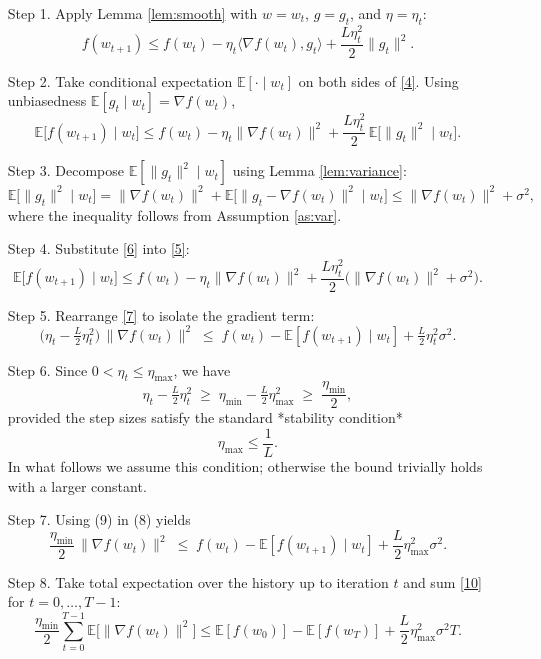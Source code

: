 \documentclass[11pt]{article}
\begin{document}
\begin{enumerate}
\item[Step 1.] Apply Lemma \ref{lem:smooth} with $w=w_t$, $g=g_t$, and $\eta=\eta_t$:
\[
f(w_{t+1})\le f(w_t)-\eta_t\langle\nabla f(w_t),g_t\rangle+\frac{L\eta_t^{2}}{2}\|g_t\|^{2}.
\tag{4}
\]

\item[Step 2.] Take conditional expectation $\mathbb{E}[\cdot\mid w_t]$ on both sides of \eqref{4}. Using unbiasedness $\mathbb{E}[g_t\mid w_t]=\nabla f(w_t)$,
\[
\mathbb{E}\big[f(w_{t+1})\mid w_t\big]\le
f(w_t)-\eta_t\|\nabla f(w_t)\|^{2}
+\frac{L\eta_t^{2}}{2}\,\mathbb{E}\big[\|g_t\|^{2}\mid w_t\big].
\tag{5}
\]

\item[Step 3.] Decompose $\mathbb{E}[\|g_t\|^{2}\mid w_t]$ using Lemma \ref{lem:variance}:
\[
\mathbb{E}\big[\|g_t\|^{2}\mid w_t\big]
= \|\nabla f(w_t)\|^{2}+\mathbb{E}\big[\|g_t-\nabla f(w_t)\|^{2}\mid w_t\big]
\le \|\nabla f(w_t)\|^{2}+\sigma^{2},
\tag{6}
\]
where the inequality follows from Assumption \ref{as:var}.

\item[Step 4.] Substitute \eqref{6} into \eqref{5}:
\[
\mathbb{E}\big[f(w_{t+1})\mid w_t\big]\le
f(w_t)-\eta_t\|\nabla f(w_t)\|^{2}
+\frac{L\eta_t^{2}}{2}\big(\|\nabla f(w_t)\|^{2}+\sigma^{2}\big).
\tag{7}
\]

\item[Step 5.] Rearrange \eqref{7} to isolate the gradient term:
\[
\big(\eta_t-\tfrac{L}{2}\eta_t^{2}\big)\,\|\nabla f(w_t)\|^{2}
\;\le\;
f(w_t)-\mathbb{E}[f(w_{t+1})\mid w_t]
+\tfrac{L}{2}\eta_t^{2}\sigma^{2}.
\tag{8}
\]

\item[Step 6.] Since $0<\eta_t\le\eta_{\max}$, we have
\[
\eta_t-\tfrac{L}{2}\eta_t^{2}
\;\ge\;
\eta_{\min}-\tfrac{L}{2}\eta_{\max}^{2}
\;\ge\;
\frac{\eta_{\min}}{2},
\tag{9}
\]
provided the step sizes satisfy the standard *stability condition*
\[
\eta_{\max}\le \frac{1}{L}.
\]
In what follows we assume this condition; otherwise the bound trivially holds with a larger constant.

\item[Step 7.] Using (9) in (8) yields
\[
\frac{\eta_{\min}}{2}\,\|\nabla f(w_t)\|^{2}
\;\le\;
f(w_t)-\mathbb{E}[f(w_{t+1})\mid w_t]
+\frac{L}{2}\eta_{\max}^{2}\sigma^{2}.
\tag{10}
\]

\item[Step 8.] Take total expectation over the history up to iteration $t$ and sum \eqref{10} for $t=0,\dots,T-1$:
\[
\frac{\eta_{\min}}{2}\sum_{t=0}^{T-1}\mathbb{E}\big[\|\nabla f(w_t)\|^{2}\big]
\le
\mathbb{E}[f(w_0)]-\mathbb{E}[f(w_T)]
+ \frac{L}{2}\eta_{\max}^{2}\sigma^{2}T .
\tag{11}
\]


\end{enumerate}
\end{document}
